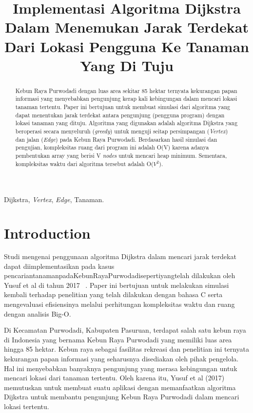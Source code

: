 \documentclass[conference]{IEEEtran}
\title{Implementasi Algoritma Dijkstra Dalam Menemukan Jarak Terdekat Dari Lokasi Pengguna Ke Tanaman Yang Di Tuju}
\author{\IEEEauthorblockN{Tanya Nuhaisy Wulandari}
\IEEEauthorblockA{\textit{School of Electrical Engineering an Informatics}\\
\textit{Institute Teknologi Bandung}\\
Bandung, Indonesia\\
Email: 18320017@std.stei.itb.ac.id}
}
\begin{document}
\maketitle

\begin{abstract}
Kebun Raya Purwodadi dengan luas area sekitar 85 hektar ternyata kekurangan papan informasi yang menyebabkan pengunjung kerap kali kebingungan dalam mencari lokasi tanaman tertentu. Paper ini bertujuan untuk membuat simulasi dari algoritma yang dapat menentukan jarak terdekat antara pengunjung (pengguna program) dengan lokasi tanaman yang dituju. Algoritma yang digunakan adalah algoritma Dijkstra yang beroperasi secara menyeluruh (\textit{greedy}) untuk menguji seitap persimpangan (\textit{Vertex}) dan jalan (\textit{Edge}) pada Kebun Raya Purwodadi. Berdasarkan hasil simulasi dan pengujian, kompleksitas ruang dari program ini adalah O(V) karena adanya pembentukan array yang berisi V \textit{nodes} untuk mencari heap minimum. Sementara, kompleksitas waktu dari algoritma tersebut adalah O($V^2$).
\end{abstract}

\begin{IEEEkeywords}
Dijkstra, \textit{Vertex}, \textit{Edge}, Tanaman.
\end{IEEEkeywords}

\section{Introduction}
Studi mengenai penggunaan algoritma Dijkstra dalam mencari jarak terdekat dapat diimplementasikan pada kasus pencariantanamanpadaKebunRayaPurwodadisepertiyangtelah dilakukan oleh Yusuf et al di tahun 2017 ~\cite{yusuf2017implementasi}. Paper ini bertujuan untuk melakukan simulasi kembali terhadap penelitian yang telah dilakukan dengan bahasa C serta mengevaluasi eﬁsiensinya melalui perhitungan kompleksitas waktu dan ruang dengan analisis Big-O.

Di Kecamatan Purwodadi, Kabupaten Pasuruan, terdapat salah satu kebun raya di Indonesia yang bernama Kebun Raya Purwodadi yang memiliki luas area hingga 85 hektar. Kebun raya sebagai fasilitas rekreasi dan penelitian ini ternyata kekurangan papan informasi yang seharusnya disediakan oleh pihak pengelola. Hal ini menyebabkan banyaknya pengunjung yang merasa kebingungan untuk mencari lokasi dari tanaman tertentu. Oleh karena itu, Yusuf et al (2017) memutuskan untuk membuat suatu aplikasi dengan memanfaatkan algoritma Dijkstra untuk membantu pengunjung Kebun Raya Purwodadi dalam mencari lokasi tertentu.
\end{document}
